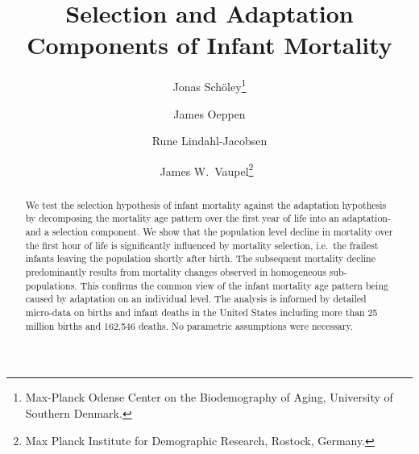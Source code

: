 \documentclass[12pt, parskip=half]{scrartcl}
\title{Selection and Adaptation Components of Infant Mortality}
\author{
  Jonas Schöley\thanks{Max-Planck Odense Center on the Biodemography of Aging, University of Southern Denmark.}
  \and
  James Oeppen\footnotemark[1]
  \and
  Rune Lindahl-Jacobsen\footnotemark[1]
  \and
  James W.~Vaupel\thanks{Max Planck Institute for Demographic Research, Rostock, Germany.}~\footnotemark[1]
}
\begin{document}
\maketitle

\thispagestyle{empty}

\begin{abstract}
We test the selection hypothesis of infant mortality against the adaptation hypothesis by decomposing the mortality age pattern over the first year of life into an adaptation- and a selection component.  We show that the population level decline in mortality over the first hour of life is significantly influenced by mortality selection, i.e.~the frailest infants leaving the population shortly after birth. The subsequent mortality decline predominantly results from mortality changes observed in homogeneous sub-populations. This confirms the common view of the infant mortality age pattern being caused by adaptation on an individual level. The analysis is informed by detailed micro-data on births and infant deaths in the United States including more than 25 million births and 162,546 deaths. No parametric assumptions were necessary.
\end{abstract}

\clearpage

\end{document}
